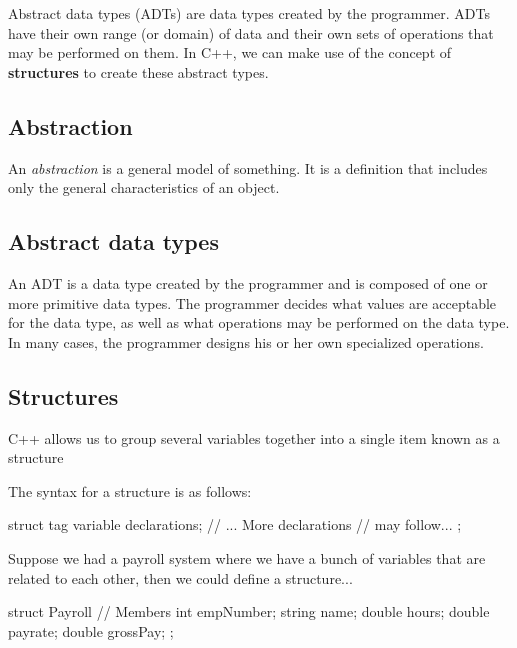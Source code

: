 \documentclass{report}
\begin{document}
    \pagebreak
    \bigbreak \noindent 
    \begin{concept}
        Abstract data types (ADTs) are data types created by the programmer. ADTs have their own range (or domain) of data and their own sets of operations that may be performed on them. In C++, we can make use of the concept of \textbf{structures} to create these abstract types. 
	\end{concept}

	\bigbreak \noindent 
	\subsection{Abstraction}
	\bigbreak \noindent 
	An \textit{abstraction} is a general model  of something. It is a definition that includes only the general characteristics of an object.

	\bigbreak \noindent 
	\subsection{Abstract data types}
	\bigbreak \noindent 
	An ADT is a data type created by the programmer and is composed of one or more primitive data types. The programmer decides what values are acceptable for the data type, as well as what operations may be performed on the data type. In many cases, the programmer designs his or her own specialized operations.

	\bigbreak \noindent 
	\subsection{Structures}
	\bigbreak \noindent 
	\begin{concept}
	    C++ allows us to group several variables together into a single item known as a structure
	\end{concept}
	\bigbreak \noindent 
	The syntax for a structure is as follows:
	\bigbreak \noindent 
	
	\begin{cppcode}
struct tag {
    variable declarations;
    // ... More declarations 
    //     may follow...
};
	\end{cppcode}
	
	\bigbreak \noindent 
	Suppose we had a payroll system where we have a bunch of variables that are related to each other, then we could define a structure...
	\bigbreak \noindent 
	
	\begin{cppcode}
struct Payroll {
    // Members
    int empNumber;
    string name;
    double hours;
    double payrate;
    double grossPay;
};
	\end{cppcode}
	
\end{document}

